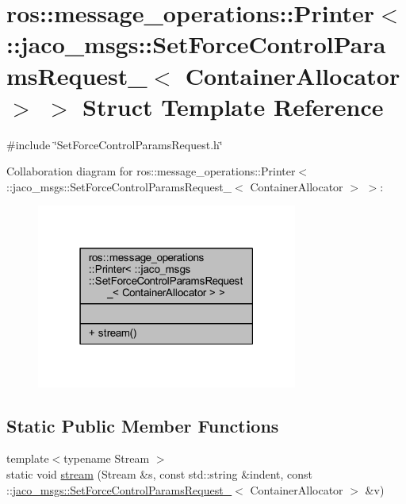 \hypertarget{structros_1_1message__operations_1_1Printer_3_01_1_1jaco__msgs_1_1SetForceControlParamsRequest__16dc020b89aeac404d6fe4c2259e46cf}{}\section{ros\+:\+:message\+\_\+operations\+:\+:Printer$<$ \+:\+:jaco\+\_\+msgs\+:\+:Set\+Force\+Control\+Params\+Request\+\_\+$<$ Container\+Allocator $>$ $>$ Struct Template Reference}
\label{structros_1_1message__operations_1_1Printer_3_01_1_1jaco__msgs_1_1SetForceControlParamsRequest__16dc020b89aeac404d6fe4c2259e46cf}


{\ttfamily \#include \char`\"{}Set\+Force\+Control\+Params\+Request.\+h\char`\"{}}



Collaboration diagram for ros\+:\+:message\+\_\+operations\+:\+:Printer$<$ \+:\+:jaco\+\_\+msgs\+:\+:Set\+Force\+Control\+Params\+Request\+\_\+$<$ Container\+Allocator $>$ $>$\+:
\nopagebreak
\begin{figure}[H]
\begin{center}
\leavevmode
\includegraphics[width=243pt]{dc/df3/structros_1_1message__operations_1_1Printer_3_01_1_1jaco__msgs_1_1SetForceControlParamsRequest__83a5de7132b58204ea3c38e428bbda1c}
\end{center}
\end{figure}
\subsection*{Static Public Member Functions}
\begin{DoxyCompactItemize}
\item 
{\footnotesize template$<$typename Stream $>$ }\\static void \hyperlink{structros_1_1message__operations_1_1Printer_3_01_1_1jaco__msgs_1_1SetForceControlParamsRequest__16dc020b89aeac404d6fe4c2259e46cf_aa3e2350f9d31ee8c1f97b77964bd0cfa}{stream} (Stream \&s, const std\+::string \&indent, const \+::\hyperlink{structjaco__msgs_1_1SetForceControlParamsRequest__}{jaco\+\_\+msgs\+::\+Set\+Force\+Control\+Params\+Request\+\_\+}$<$ Container\+Allocator $>$ \&v)
\end{DoxyCompactItemize}


